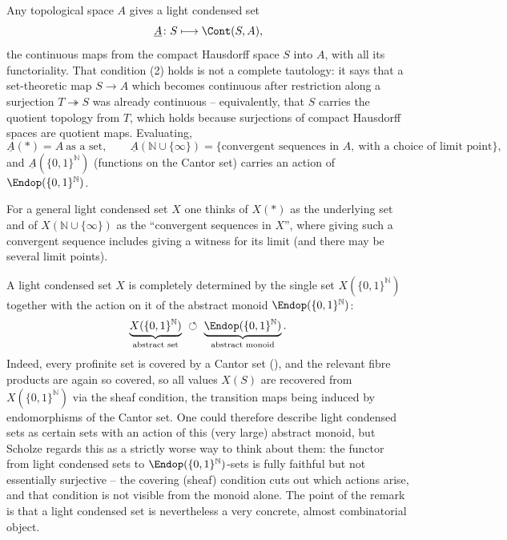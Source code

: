 \begin{example}
\label{ex:2:top-to-condensed}
Any topological space $A$ gives a light condensed set
\begin{equation*}
\underline{A}\colon S\longmapsto \Cont(S,A),
\end{equation*}
the continuous maps from the compact Hausdorff space $S$ into $A$, with all its
functoriality. That condition (2) holds is not a complete tautology: it says that
a set-theoretic map $S\to A$ which becomes continuous after restriction along a
surjection $T\twoheadrightarrow S$ was already continuous -- equivalently, that
$S$ carries the quotient topology from $T$, which holds because surjections of
compact Hausdorff spaces are quotient maps. Evaluating,
\[
\underline{A}(\ast)=A\ \text{as a set},\qquad
\underline{A}(\mathbb{N}\cup\{\infty\})=\{\text{convergent sequences in }A,\
\text{with a choice of limit point}\},
\]
and $\underline{A}(\{0,1\}^{\mathbb{N}})$ (functions on the Cantor set) carries an
action of $\Endop(\{0,1\}^{\mathbb{N}})$.
\end{example}

For a general light condensed set $X$ one thinks of $X(\ast)$ as the underlying
set and of $X(\mathbb{N}\cup\{\infty\})$ as the ``convergent sequences in $X$'',
where giving such a convergent sequence includes giving a witness for its limit
(and there may be several limit points).

\begin{remark}
\label{rmk:2:monoid-action}
A light condensed set $X$ is completely determined by the single set
$X(\{0,1\}^{\mathbb{N}})$ together with the action on it of the abstract monoid
$\Endop(\{0,1\}^{\mathbb{N}})$:
\[
\underbrace{X(\{0,1\}^{\mathbb{N}})}_{\text{abstract set}}\ \circlearrowleft\
\underbrace{\Endop(\{0,1\}^{\mathbb{N}})}_{\text{abstract monoid}}.
\]
Indeed, every profinite set is covered by a Cantor set
(), and the relevant fibre products are again so
covered, so all values $X(S)$ are recovered from $X(\{0,1\}^{\mathbb{N}})$ via the
sheaf condition, the transition maps being induced by endomorphisms of the Cantor
set. One could therefore describe light condensed sets as certain sets with an
action of this (very large) abstract monoid, but Scholze regards this as a
strictly worse way to think about them: the functor from light condensed sets to
$\Endop(\{0,1\}^{\mathbb{N}})$-sets is fully faithful but not essentially
surjective -- the covering (sheaf) condition cuts out which actions arise, and
that condition is not visible from the monoid alone. The point of the remark is
that a light condensed set is nevertheless a very concrete, almost combinatorial
object.
\end{remark}

